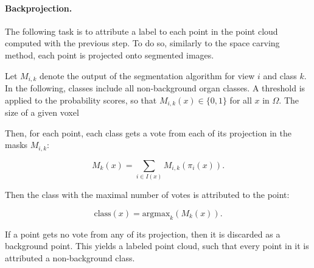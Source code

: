 \paragraph{Backprojection. }

The following task is to attribute a label to each point in the point cloud
computed with the previous step. To do so, similarly to the space carving
method, each point is projected onto segmented images.

Let $M_{i,k}$ denote the output of the segmentation algorithm for view $i$ and
class $k$. In the following, classes include all non-background organ classes.
A threshold is applied to the probability scores, so that $M_{i,k} (x) \in \{0,
1\}$ for all $x$ in $\Omega$. The size of a given voxel

Then, for each point, each class gets a vote from each of its
projection in the masks $M_{i,k}$:

$$
M_k(x) = \sum_{i\in I(x)} M_{i,k} (\pi_i(x) ).
$$

Then the class with the maximal number of votes is attributed to the point:

$$
\textrm{class}(x) = \textrm{argmax}_k ( M_k(x) ).
$$

If a point gets no vote from any of its projection, then it is discarded as a
background point.  This yields a labeled point cloud, such that every point in
it is attributed a non-background class.
